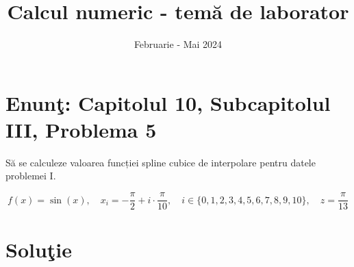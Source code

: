 \documentclass{article}
\begin{document}
\title{Calcul numeric - tem\u{a} de laborator}

\author{}

\date{Februarie - Mai 2024}

\maketitle              %








\section*{Enun\c{t}: Capitolul 10, Subcapitolul III, Problema 5}

S\u{a} se calculeze valoarea funcției spline cubice de interpolare pentru datele
problemei I.

\begin{center}
\[
f(x) = \sin(x),
\quad x_i = -\frac{\pi}{2} + i \cdot \frac{\pi}{10},
\quad i \in \{0, 1, 2, 3, 4, 5, 6, 7, 8, 9, 10\},
\quad z = \frac{\pi}{13}
\] 

\end{center}

\section*{Solu\c{t}ie}
\end{document}
